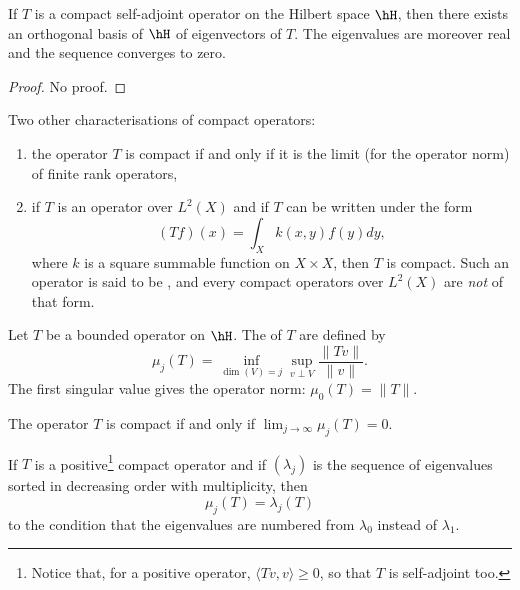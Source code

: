 \begin{theorem}
If $T$ is a compact self-adjoint operator on the Hilbert space $\hH$, then there exists an orthogonal basis of $\hH$ of eigenvectors of $T$. The eigenvalues are moreover real and the sequence converges to zero.
\end{theorem}
\begin{proof}
No proof.
\end{proof}
\begin{proposition}
Two other characterisations of compact operators:
\begin{enumerate}
\item the operator $T$ is compact if and only if it is the limit (for the operator norm) of finite rank operators,
\item if $T$ is an operator over $L^2(X)$ and if $T$ can be written under the form
\[
  (Tf)(x)=\int_X k(x,y)f(y)dy,
\]
where $k$ is a square summable function on $X\times X$, then $T$ is compact. Such an operator is said to be , and every compact operators over $L^2(X)$ are \emph{not} of that form.
\end{enumerate}
\end{proposition}

Let $T$ be a bounded operator on $\hH$. The  of $T$ are defined by
\begin{equation}
\mu_j(T)=\inf_{\dim(V)=j}\sup_{v\perp V}\frac{ \| Tv \| }{ \| v \| }.
\end{equation}
The first singular value gives the operator norm: $\mu_0(T)=\| T \|$.

\begin{proposition}
The operator $T$ is compact if and only if $\lim_{j\to\infty}\mu_j(T)=0$.
\end{proposition}

\begin{lemma}		\label{Lemmulamequ}
If $T$ is a positive\footnote{Notice that, for a positive operator, $\langle Tv, v\rangle \geq 0$, so that $T$ is self-adjoint too.} compact operator and if $(\lambda_j)$ is the sequence of eigenvalues sorted in decreasing order with multiplicity, then
\begin{equation}
\mu_j(T)=\lambda_j(T)
\end{equation}
to the condition that the eigenvalues are numbered from $\lambda_0$ instead of $\lambda_1$.
\end{lemma}

